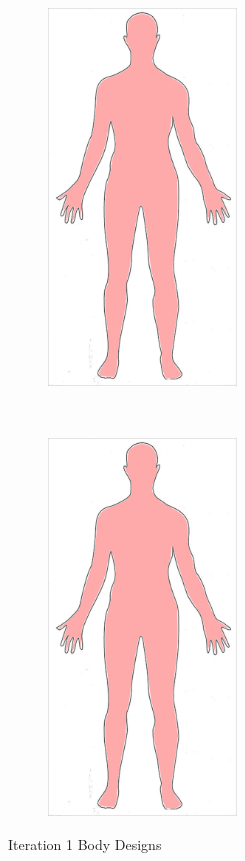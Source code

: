 \clearpage
\begin{figure}[t!]
    \centering
    \begin{subfigure}[t]{0.5\textwidth}
        \centering
        \includegraphics[height=10cm]{figures/bodydesign1front.png}
    \end{subfigure}%
    ~
    \begin{subfigure}[t]{0.5\textwidth}
        \centering
        \includegraphics[height=10cm]{figures/bodydesign1front.png}
    \end{subfigure}
    \caption{Iteration 1 Body Designs}
    \label{fig:it1design}
\end{figure}

